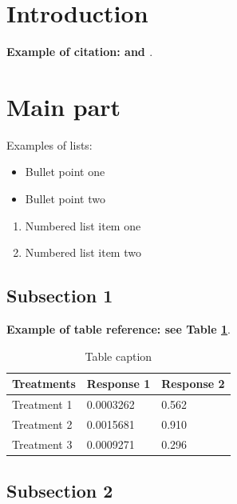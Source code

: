 \documentclass{article}
\begin{document}
\section{Introduction}

    \textbf{Example of citation: \cite{Smith_2013} and \cite{Smith_2012}}. \lipsum[2]

\section{Main part}
    \label{S:1}
    \lipsum[9]

    Examples of lists:
    \begin{itemize}
        \item Bullet point one
        \item Bullet point two
    \end{itemize}

    \begin{enumerate}
        \item Numbered list item one
        \item Numbered list item two
    \end{enumerate}

    \subsection{Subsection 1}

        \textbf{Example of table reference: see Table \ref{tab:example}}.
        \lipsum[4]

        \begin{table}[ht] 
            \centering
            \begin{tabular}{l l l}
                \hline
                \textbf{Treatments} & \textbf{Response 1} & \textbf{Response 2}\\
                \hline
                Treatment 1 & 0.0003262 & 0.562 \\
                Treatment 2 & 0.0015681 & 0.910 \\
                Treatment 3 & 0.0009271 & 0.296 \\
                \hline
            \end{tabular}
            \caption{Table caption}
            \label{tab:example}
        \end{table}

    \subsection{Subsection 2}
\end{document}
